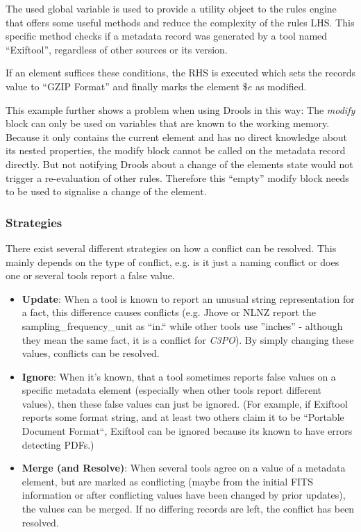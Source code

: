 \documentclass[a4paper,12pt]{article}
\begin{document}
The used global variable is used to provide a utility object to the rules engine that offers some useful methods and reduce the complexity of the rules LHS. This specific method checks if a metadata record was generated by a tool named ``Exiftool'', regardless of other sources or its version.

If an element suffices these conditions, the RHS is executed which sets the records value to ``GZIP Format'' and finally marks the element $\$e$ as modified. 

This example further shows a problem when using Drools in this way: The \emph{modify} block can only be used on variables that are known to the working memory. Because it only contains the current element and has no direct knowledge about its nested properties, the modify block cannot be called on the metadata record directly. But not notifying Drools about a change of the elements state would not trigger a re-evaluation of other rules. Therefore this ``empty'' modify block needs to be used to signalise a change of the element.

\subsubsection{Strategies}

There exist several different strategies on how a conflict can be resolved. This mainly depends on the type of conflict, e.g. is it just a naming conflict or does one or several tools report a false value.

\begin{itemize}
\item \textbf{Update}: When a tool is known to report an unusual string representation for a fact, this difference causes conflicts (e.g. Jhove or NLNZ report the sampling_frequency_unit as ``in.`` while other tools use ''inches'' - although they mean the same fact, it is a conflict for \emph{C3PO}). By simply changing these values, conflicts can be resolved.
\item \textbf{Ignore}: When it's known, that a tool sometimes reports false values on a specific metadata element (especially when other tools report different values), then these false values can just be ignored. (For example, if Exiftool reports some format string, and at least two others claim it to be ``Portable Document Format``, Exiftool can be ignored because its known to have errors detecting PDFs.)
\item \textbf{Merge (and Resolve)}: When several tools agree on a value of a metadata element, but are marked as conflicting (maybe from the initial FITS information or after conflicting values have been changed by prior updates), the values can be merged. If no differing records are left, the conflict has been resolved.

\end{itemize}
\end{document}
